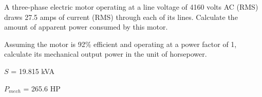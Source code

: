 

A three-phase electric motor operating at a line voltage of 4160 volts AC (RMS) draws 27.5 amps of current (RMS) through each of its lines.  Calculate the amount of apparent power consumed by this motor.

\vskip 10pt

Assuming the motor is 92\% efficient and operating at a power factor of 1, calculate its mechanical output power in the unit of horsepower.







$S$ = 19.815 kVA

\vskip 10pt

$P_{mech}$ = 265.6 HP












